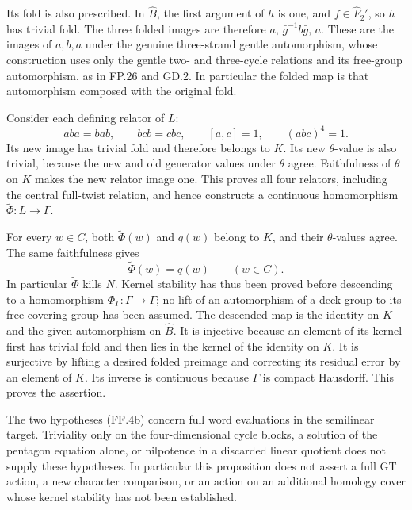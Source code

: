 Its fold is also prescribed. In $\widehat B$, the first
argument of $h$ is one, and $f\in\widehat F_2'$, so $h$
has trivial fold. The three folded images are therefore
$a,\,\bar g^{-1}b\bar g,\,a$. These are the images of
$a,b,a$ under the genuine three-strand gentle automorphism,
whose construction uses only the gentle two- and three-cycle
relations and its free-group automorphism, as in FP.26 and
GD.2. In particular the folded map is that automorphism
composed with the original fold.

Consider each defining relator of $L$:
\[
             aba=bab,\qquad bcb=cbc,\qquad
             [a,c]=1,\qquad (abc)^4=1.
\]
Its new image has trivial fold and therefore belongs to $K$.
Its new $\theta$-value is also trivial, because the new and
old generator values under $\theta$ agree. Faithfulness of
$\theta$ on $K$ makes the new relator image one. This proves
all four relators, including the central full-twist relation,
and hence constructs a continuous homomorphism
$\widetilde\Phi:L\to\Gamma$.

For every $w\in C$, both $\widetilde\Phi(w)$ and $q(w)$
belong to $K$, and their $\theta$-values agree. The same
faithfulness gives
\[
                         \widetilde\Phi(w)=q(w)
                                  \qquad(w\in C).
 \tag{FF.4d}
\]
In particular $\widetilde\Phi$ kills $N$. Kernel stability
has thus been proved before descending to a homomorphism
$\Phi_\Gamma:\Gamma\to\Gamma$; no lift of an automorphism
of a deck group to its free covering group has been assumed.
The descended map is the identity on $K$ and the given
automorphism on $\widehat B$. It is injective because an
element of its kernel first has trivial fold and then lies
in the kernel of the identity on $K$. It is surjective by
lifting a desired folded preimage and correcting its residual
error by an element of $K$. Its inverse is continuous because
$\Gamma$ is compact Hausdorff. This proves the assertion.

The two hypotheses (FF.4b) concern full word evaluations in
the semilinear target. Triviality only on the four-dimensional
cycle blocks, a solution of the pentagon equation alone, or
nilpotence in a discarded linear quotient does not supply
these hypotheses. In particular this proposition does not
assert a full GT action, a new character comparison, or an
action on an additional homology cover whose kernel stability
has not been established.

